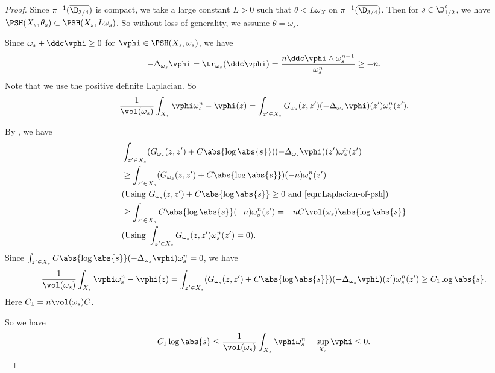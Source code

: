 \documentclass[12pt]{amsart}
\begin{document}
\begin{proof}
    Since $\pi^{-1}(\overline{\D_{3/4}})$ is compact, we take 
    a large constant $L > 0$ such that $\theta < L \omega_X$
    on $\pi^{-1}(\overline{\D_{3/4}})$. Then for $s \in \D^{\circ}_{1/2}$, we have $\PSH(X_s, \theta_s) \subset 
    \PSH(X_s, L\omega_s)$. So without loss of generality, 
    we assume $\theta = \omega_s$.

    Since $\omega_s + \ddc \vphi \geq 0$ for $\vphi \in \PSH(X_s, \omega_s)$, we have 
    \begin{equation}
        \label{eqn:Laplacian-of-psh}
        -\Delta_{\omega_s} \vphi = \tr_{\omega_s} (\ddc \vphi)
    = \frac{n \ddc \vphi \wedge \omega_s^{n-1}}{\omega_s^n}
    \geq -n.
    \end{equation}
    Note that we use the positive definite Laplacian. So 
    \[
    \frac{1}{\vol(\omega_s)}\int_{X_s} \vphi \omega_s^n
    - \vphi(z) = \int_{z' \in X_s} G_{\omega_s}(z, z')
    (-\Delta_{\omega_s} \vphi)(z') \omega_s^n(z').
    \]

    By , we have 
    \begin{align*}
        &\int_{z' \in X_s} (G_{\omega_s}(z, z') + C \abs{\log \abs{s}})
        (-\Delta_{\omega_s} \vphi)(z') \omega_s^n(z') \\
        &\geq \int_{z' \in X_s} (G_{\omega_s}(z, z') + C \abs{\log \abs{s}})
        (-n) \omega_s^n(z')\\
        &(\text{Using }G_{\omega_s}(z, z') + C \abs{\log \abs{s}} \geq 0 \text{ and } \cref{eqn:Laplacian-of-psh})\\
        &\geq  \int_{z' \in X_s}C \abs{\log \abs{s}}
        (-n) \omega_s^n(z') = -nC \vol(\omega_s) \abs{\log \abs{s}}\\
        &(\text{Using }\int_{z' \in X_s}G_{\omega_s}(z, z') \omega_s^n(z') = 0 ).
    \end{align*}
    Since $\int_{z' \in X_s} C \abs{\log \abs{s}}
    (-\Delta_{\omega_s} \vphi) \omega_s^n = 0$, we have 
    \[
    \frac{1}{\vol(\omega_s)}\int_{X_s} \vphi \omega_s^n
    - \vphi(z) 
    = \int_{z' \in X_s} (G_{\omega_s}(z, z') + C \abs{\log \abs{s}})
    (-\Delta_{\omega_s} \vphi)(z') \omega_s^n(z')
    \geq C_1 \log \abs{s}.
    \]
    Here $C_1 = n \vol(\omega_s) C$.

    So we have 
    \[
    C_1 \log\abs{s} \leq \frac{1}{\vol(\omega_s)}\int_{X_s} \vphi \omega_s^n  - \sup_{X_s} \vphi \leq 0.
    \]
\end{proof}
\end{document}
